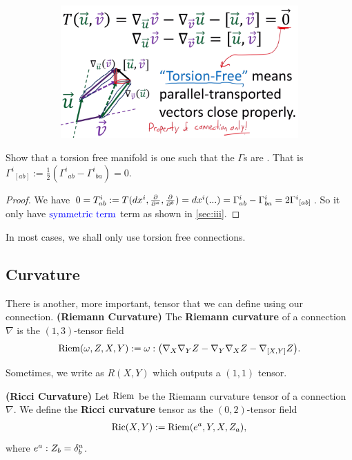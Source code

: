 \documentclass[12pt]{article} %
\newcommand{\bfs}[1]{\textbf{({#1}) }}
\begin{document}
\begin{enumerate}
\begin{figure}[h]
     \hfill
     \begin{subfigure}[b]{0.4\textwidth}
         \centering
         \includegraphics[width=\textwidth]{Figs/torsion2-min.png}
     \end{subfigure}
\end{figure}

\end{enumerate}

\begin{lema}\label{lem:oenqrgrgd}
 Show that a torsion free manifold is one such that the $\Gamma$s are . That is ${\Gamma^i}_{[ab]} := \frac{1}{2} ({\Gamma^i}_{ab} - {\Gamma^i}_{ba}) =0$. 
\end{lema}
\begin{proof}
    We have $0=T^i_{ab}:= T(dx^i, \frac{\partial}{\partial^a}, \frac{\partial}{\partial^b})=dx^i(...)=\Gamma^i_{ab}-\Gamma^i_{ba}=2{\Gamma^i}_{[ab]}$. So it only have $\textcolor{blue}{\text{symmetric term}}$ term as shown in \cref{sec:iii}.
\end{proof}

\br 
    In most cases, we shall only use torsion free connections.
\er 
\subsection{Curvature}
There is another, more important, tensor that we can define using our connection.
\bd\bfs{Riemann Curvature}
    The \textbf{Riemann curvature} of a connection $\nabla$ is the $(1,3)$-tensor field
    \begin{align*}
        \mathrm{Riem}(\omega,Z,X,Y) := \omega : \big( \nabla_X\nabla_Y Z - \nabla_Y\nabla_X Z - \nabla_{[X,Y]}Z \big).
    \end{align*}
\ed 
\begin{rema}
Sometimes, we write as $R(X,Y)$ which outputs a $(1,1)$ tensor.
\end{rema}
\bd\bfs{Ricci Curvature}
    Let $\mathrm{Riem}$ be the Riemann curvature tensor of a connection $\nabla$. We define the \textbf{Ricci curvature} tensor as the $(0,2)$-tensor field 
    \begin{align*}
        \text{Ric}(X,Y) := \mathrm{Riem}(e^a,Y,X,Z_a),
    \end{align*}
    where $e^a:Z_b = \delta^a_b$.
\ed
\end{document}
